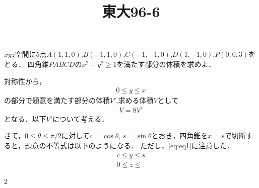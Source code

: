 \documentclass[a4j]{jarticle}
\title{東大96-6}
\begin{document}
\maketitle

\begin{oframed}
 $xyz$空間に5点$A(1,1,0)$,$B(-1,1,0)$,$C(-1,-1,0)$,$D(1,-1,0)$,$P(0,0,3)$をとる．
 四角錐$PABCD$の$x^2+y^2\ge1$を満たす部分の体積を求めよ．
 \end{oframed}
 \setlength{\columnseprule}{0.4pt}
 \begin{multicols}{2}
\textgt{[解]} 対称性から，
 \begin{align}
 0\le y\le x             \label{eq:eq1}
 \end{align}
 の部分で題意を満たす部分の体積$V'$,求める体積$V$として
 \begin{align}
V=8V'
\end{align}
となる．以下$V'$について考える．

さて，$0\le\theta\le\pi/2$に対して$c=\cos\theta$,
$s=\sin\theta$とおき，四角錐を$x=s$で切断すると，題意の不等式は以下のようになる．
ただし，\eqref{eq:eq1}に注意した．
\begin{align*}
c\le y\le s \\
0\le z\le 
\end{align*}


\newpage
 \end{multicols}{2}
 
\end{document}
